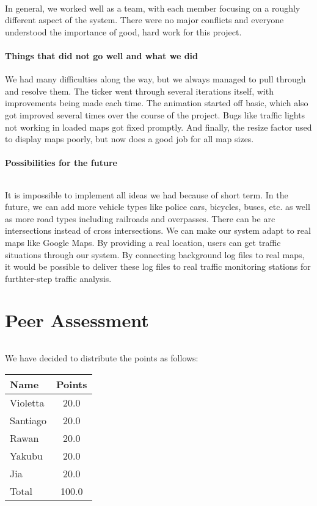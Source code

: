 \documentclass[a4paper,11pt,titlepage]{article}
\begin{document}
\paragraph{}
In general, we worked well as a team, with each member focusing on a roughly different aspect of the system. There were no major conflicts and everyone understood the importance of good, hard work for this project.

\subsection{Things that did not go well and what we did}
We had many difficulties along the way, but we always managed to pull through and resolve them. The ticker went through several iterations itself, with improvements being made each time. The animation started off basic, which also got improved several times over the course of the project. Bugs like traffic lights not working in loaded maps got fixed promptly. And finally, the resize factor used to display maps poorly, but now does a good job for all map sizes.

\subsection{Possibilities for the future}
\paragraph{}
It is impossible to implement all ideas we had because of short term. In the future, we can add more vehicle types like police cars, bicycles, buses, etc. as well as more road types including railroads and overpasses. There can be arc intersections instead of cross intersections. We can make our system adapt to real maps like Google Maps. By providing a real location, users can get traffic situations through our system. By connecting background log files to real maps, it would be possible to deliver these log files to real traffic monitoring stations for furthter-step traffic analysis.

\part{Peer Assessment}
\paragraph{}
We have decided to distribute the points as follows:
\begin{center}
\begin{tabular}{ l | c }
  Name & Points \\ \hline
  Violetta & 20.0 \\
  Santiago & 20.0 \\
  Rawan & 20.0 \\
  Yakubu & 20.0 \\ 
  Jia & 20.0\\ \hline \hline
  Total & 100.0\\
  \hline
\end{tabular}
\end{center}
\end{document}
